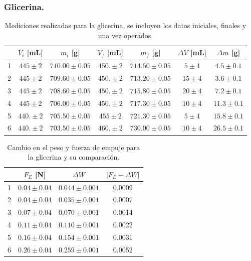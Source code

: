 \documentclass[a4paper]{article}
\begin{document}
\subsubsection*{Glicerina.}%
\begin{table}[H]
  \centering
    \begin{tabular}{|c|c|c|c|c|c|c|} \hline
     & $V_i$ [mL] & $m_i$ [g] & $V_f$ [mL] & $m_f$ [g] & $\Delta V$ [mL] & $\Delta m$ [g] \\ \hline
    1     & $445\pm2$ & $710.00\pm0.05$ & $450.\pm2$ & $714.50\pm0.05$ & $5\pm4$ & $4.5\pm0.1$ \\ \hline
    2     & $445\pm2$ & $709.60\pm0.05$ & $450.\pm2$ & $713.20\pm0.05$ & $15\pm4$ & $3.6\pm0.1$ \\ \hline
    3     & $445\pm2$ & $708.60\pm0.05$ & $450.\pm2$ & $715.80\pm0.05$ & $20\pm4$ & $7.2\pm0.1$ \\ \hline
    4     & $445\pm2$ & $706.00\pm0.05$ & $450.\pm2$ & $717.30\pm0.05$ & $10\pm4$ & $11.3\pm0.1$ \\ \hline
    5     & $440.\pm2$ & $705.50\pm0.05$ & $455\pm2$ & $721.30\pm0.05$ & $5\pm4$ & $15.8\pm0.1$ \\ \hline
    6     & $440.\pm2$ & $703.50\pm0.05$ & $460.\pm2$ & $730.00\pm0.05$ & $10\pm4$ & $26.5\pm0.1$ \\ \hline
    \end{tabular}%
  \caption{Mediciones realizadas para la glicerina, se incluyen los datos iniciales, finales y una vez operados.}
\end{table}%

\begin{table}[H]
  \centering
    \begin{tabular}{|c|c|c|c|} \hline
          & $F_E$ [N] & $\Delta W$ & $| F_E - \Delta W |$ \\ \hline
    1     & $0.04\pm0.04$ & $0.044\pm0.001$ & 0.0009 \\ \hline
    2     & $0.04\pm0.04$ & $0.035\pm0.001$ & 0.0007 \\ \hline
    3     & $0.07\pm0.04$ & $0.070\pm0.001$ & 0.0014 \\ \hline
    4     & $0.11\pm0.04$ & $0.110\pm0.001$ & 0.0022 \\ \hline
    5     & $0.16\pm0.04$ & $0.154\pm0.001$ & 0.0031 \\ \hline
    6     & $0.26\pm0.04$ & $0.259\pm0.001$ & 0.0052 \\ \hline
    \end{tabular}%
  \caption{Cambio en el peso y fuerza de empuje para la glicerina y su comparación.}
\end{table}%
\end{document}
